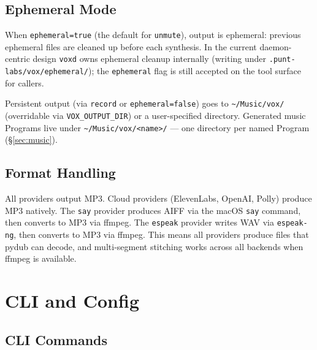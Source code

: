 \documentclass[a4paper,10pt]{article}
\newcommand{\tool}[1]{\texttt{#1}}
\newcommand{\field}[1]{\texttt{#1}}
\begin{document}
\subsection{Ephemeral Mode}

When \field{ephemeral=true} (the default for \tool{unmute}),
output is ephemeral: previous ephemeral files are cleaned up before
each synthesis.  In the current daemon-centric design \texttt{voxd}
owns ephemeral cleanup internally (writing under
\texttt{.punt-labs/vox/ephemeral/}); the \field{ephemeral} flag is
still accepted on the tool surface for callers.

Persistent output (via \tool{record} or \field{ephemeral=false})
goes to \texttt{\~{}/Music/vox/} (overridable via
\texttt{VOX\_OUTPUT\_DIR}) or a user-specified directory.  Generated
music Programs live under \texttt{\~{}/Music/vox/<name>/} --- one
directory per named Program (\S\ref{sec:music}).

\subsection{Format Handling}

All providers output MP3.  Cloud providers (ElevenLabs, OpenAI,
Polly) produce MP3 natively.  The \texttt{say} provider produces
AIFF via the macOS \texttt{say} command, then converts to MP3
via ffmpeg.  The \texttt{espeak} provider writes WAV via
\texttt{espeak-ng}, then converts to MP3 via ffmpeg.
This means all providers produce files that pydub can decode,
and multi-segment stitching works across all backends when
ffmpeg is available.


\section{CLI and Config}

\subsection{CLI Commands}
\end{document}
